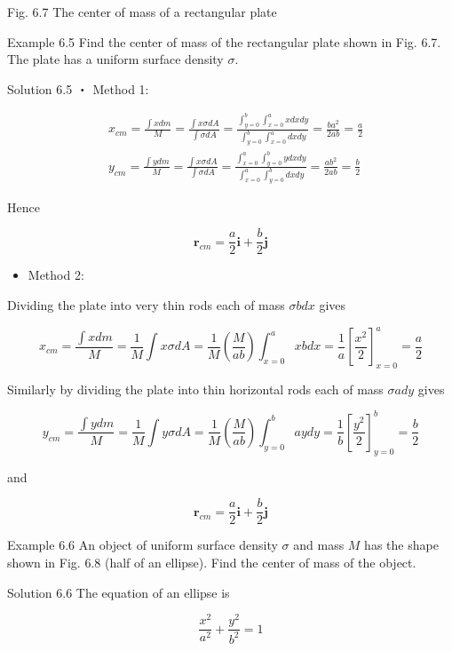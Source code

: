 \documentclass[10pt]{article}
\begin{document}
Fig. 6.7 The center of mass of a rectangular plate

Example 6.5 Find the center of mass of the rectangular plate shown in Fig. 6.7. The plate has a uniform surface density $\sigma$.

Solution 6.5 ・ Method 1:

$$
\begin{aligned}
& x_{c m}=\frac{\int x d m}{M}=\frac{\int x \sigma d A}{\int \sigma d A}=\frac{\int_{y=0}^{b} \int_{x=0}^{a} x d x d y}{\int_{y=0}^{b} \int_{x=0}^{a} d x d y}=\frac{b a^{2}}{2 a b}=\frac{a}{2} \\
& y_{c m}=\frac{\int y d m}{M}=\frac{\int x \sigma d A}{\int \sigma d A}=\frac{\int_{x=0}^{a} \int_{y=0}^{b} y d x d y}{\int_{x=0}^{a} \int_{y=0}^{b} d x d y}=\frac{a b^{2}}{2 a b}=\frac{b}{2}
\end{aligned}
$$

Hence

$$
\mathbf{r}_{c m}=\frac{a}{2} \mathbf{i}+\frac{b}{2} \mathbf{j}
$$

\begin{itemize}
  \item Method 2:
\end{itemize}

Dividing the plate into very thin rods each of mass $\sigma b d x$ gives

$$
x_{c m}=\frac{\int x d m}{M}=\frac{1}{M} \int x \sigma d A=\frac{1}{M}\left(\frac{M}{a b}\right) \int_{x=0}^{a} x b d x=\frac{1}{a}\left[\frac{x^{2}}{2}\right]_{x=0}^{a}=\frac{a}{2}
$$

Similarly by dividing the plate into thin horizontal rods each of mass $\sigma a d y$ gives

$$
y_{c m}=\frac{\int y d m}{M}=\frac{1}{M} \int y \sigma d A=\frac{1}{M}\left(\frac{M}{a b}\right) \int_{y=0}^{b} a y d y=\frac{1}{b}\left[\frac{y^{2}}{2}\right]_{y=0}^{b}=\frac{b}{2}
$$

and

$$
\mathbf{r}_{c m}=\frac{a}{2} \mathbf{i}+\frac{b}{2} \mathbf{j}
$$

Example 6.6 An object of uniform surface density $\sigma$ and mass $M$ has the shape shown in Fig. 6.8 (half of an ellipse). Find the center of mass of the object.

Solution 6.6 The equation of an ellipse is

$$
\frac{x^{2}}{a^{2}}+\frac{y^{2}}{b^{2}}=1
$$
\end{document}
